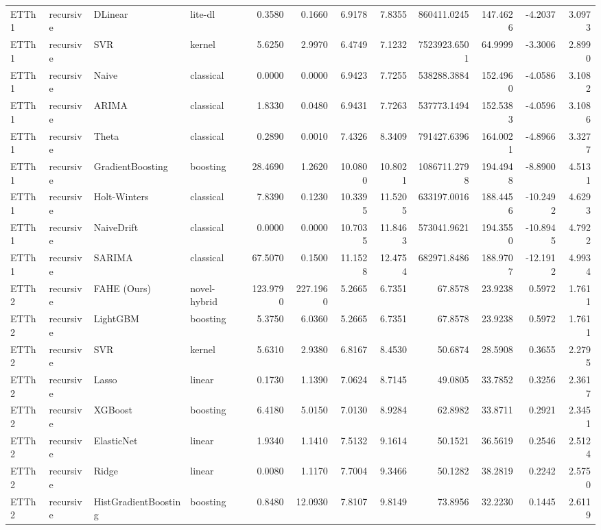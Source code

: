 \begin{tabular}{llllrrrrrrrr}
ETTh1 & recursive & DLinear & lite-dl & 0.3580 & 0.1660 & 6.9178 & 7.8355 & 860411.0245 & 147.4626 & -4.2037 & 3.0973 \\
ETTh1 & recursive & SVR & kernel & 5.6250 & 2.9970 & 6.4749 & 7.1232 & 7523923.6501 & 64.9999 & -3.3006 & 2.8990 \\
ETTh1 & recursive & Naive & classical & 0.0000 & 0.0000 & 6.9423 & 7.7255 & 538288.3884 & 152.4960 & -4.0586 & 3.1082 \\
ETTh1 & recursive & ARIMA & classical & 1.8330 & 0.0480 & 6.9431 & 7.7263 & 537773.1494 & 152.5383 & -4.0596 & 3.1086 \\
ETTh1 & recursive & Theta & classical & 0.2890 & 0.0010 & 7.4326 & 8.3409 & 791427.6396 & 164.0021 & -4.8966 & 3.3277 \\
ETTh1 & recursive & GradientBoosting & boosting & 28.4690 & 1.2620 & 10.0800 & 10.8021 & 1086711.2798 & 194.4948 & -8.8900 & 4.5131 \\
ETTh1 & recursive & Holt-Winters & classical & 7.8390 & 0.1230 & 10.3395 & 11.5205 & 633197.0016 & 188.4456 & -10.2492 & 4.6293 \\
ETTh1 & recursive & NaiveDrift & classical & 0.0000 & 0.0000 & 10.7035 & 11.8463 & 573041.9621 & 194.3550 & -10.8945 & 4.7922 \\
ETTh1 & recursive & SARIMA & classical & 67.5070 & 0.1500 & 11.1528 & 12.4754 & 682971.8486 & 188.9707 & -12.1912 & 4.9934 \\
ETTh2 & recursive & FAHE (Ours) & novel-hybrid & 123.9790 & 227.1960 & 5.2665 & 6.7351 & 67.8578 & 23.9238 & 0.5972 & 1.7611 \\
ETTh2 & recursive & LightGBM & boosting & 5.3750 & 6.0360 & 5.2665 & 6.7351 & 67.8578 & 23.9238 & 0.5972 & 1.7611 \\
ETTh2 & recursive & SVR & kernel & 5.6310 & 2.9380 & 6.8167 & 8.4530 & 50.6874 & 28.5908 & 0.3655 & 2.2795 \\
ETTh2 & recursive & Lasso & linear & 0.1730 & 1.1390 & 7.0624 & 8.7145 & 49.0805 & 33.7852 & 0.3256 & 2.3617 \\
ETTh2 & recursive & XGBoost & boosting & 6.4180 & 5.0150 & 7.0130 & 8.9284 & 62.8982 & 33.8711 & 0.2921 & 2.3451 \\
ETTh2 & recursive & ElasticNet & linear & 1.9340 & 1.1410 & 7.5132 & 9.1614 & 50.1521 & 36.5619 & 0.2546 & 2.5124 \\
ETTh2 & recursive & Ridge & linear & 0.0080 & 1.1170 & 7.7004 & 9.3466 & 50.1282 & 38.2819 & 0.2242 & 2.5750 \\
ETTh2 & recursive & HistGradientBoosting & boosting & 0.8480 & 12.0930 & 7.8107 & 9.8149 & 73.8956 & 32.2230 & 0.1445 & 2.6119 \\

\end{tabular}
